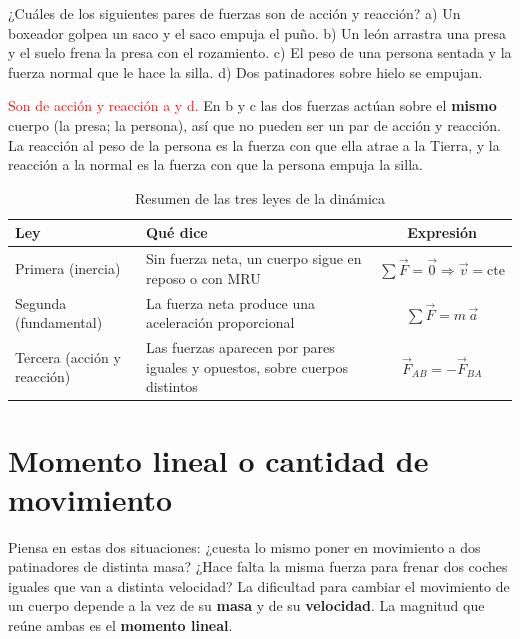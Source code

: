 \begin{exercise}
    ¿Cuáles de los siguientes pares de fuerzas son de acción y reacción? a) Un boxeador golpea un saco y el saco empuja el puño.
    b) Un león arrastra una presa y el suelo frena la presa con el rozamiento. c) El peso de una persona sentada y la fuerza normal
    que le hace la silla. d) Dos patinadores sobre hielo se empujan.
    \begin{solu}
        \textcolor{red}{Son de acción y reacción a y d.} En b y c las dos fuerzas actúan sobre el \textbf{mismo} cuerpo (la presa; la
        persona), así que no pueden ser un par de acción y reacción. La reacción al peso de la persona es la fuerza con que ella atrae
        a la Tierra, y la reacción a la normal es la fuerza con que la persona empuja la silla.
    \end{solu}
\end{exercise}

\begin{table}[H]
    \centering
    \caption{Resumen de las tres leyes de la dinámica}
    \vspace{-5pt}
    \begin{tabular}{@{}lL{5.2cm}c@{}}
        \toprule
        \textbf{Ley} & \textbf{Qué dice} & \textbf{Expresión} \\
        \midrule
        Primera (inercia) & Sin fuerza neta, un cuerpo sigue en reposo o con MRU & \(\sum \vec{F} = \vec{0} \Rightarrow \vec{v} = \text{cte}\) \\[3pt]
        Segunda (fundamental) & La fuerza neta produce una aceleración proporcional & \(\sum \vec{F} = m\,\vec{a}\) \\[3pt]
        Tercera (acción y reacción) & Las fuerzas aparecen por pares iguales y opuestos, sobre cuerpos distintos & \(\vec{F}_{AB} = -\vec{F}_{BA}\) \\
        \bottomrule
    \end{tabular}
    \label{tab:ud10-leyes}
\end{table}

\section{Momento lineal o cantidad de movimiento}\label{sec:ud10-momento-lineal}

Piensa en estas dos situaciones: ¿cuesta lo mismo poner en movimiento a dos patinadores de distinta masa? ¿Hace falta la misma fuerza
para frenar dos coches iguales que van a distinta velocidad? La dificultad para cambiar el movimiento de un cuerpo depende a la vez
de su \textbf{masa} y de su \textbf{velocidad}. La magnitud que reúne ambas es el \textbf{momento lineal}.

